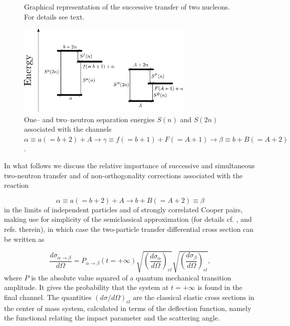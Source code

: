 \begin{subappendices}
\begin{figure}[h!]
\begin{center}
\end{center}
	\caption{Graphical representation of  the successive transfer of two nucleons. For details see text.}
\label{figC7C2}
\end{figure}
 \begin{figure}
 	\begin{center}
\includegraphics*[width=0.75\textwidth]{C7/figs_C7/figC7C3}
\end{center}
\caption{One-- and two--neutron separation energies $S(n)$ and $S(2n)$ associated with the channels $\alpha\equiv a(=b+2)+A \rightarrow \gamma \equiv f(=b+1)+F(=A+1)\rightarrow \beta \equiv b+B(=A+2)$.}\label{figC7C3}
\end{figure}
In what follows we discuss the relative importance of successive and simultaneous two-neutron transfer and of non-orthogonality 
corrections associated with the reaction 

\begin{equation}
\alpha \equiv  a(=b+2) + A \to b + B(=A+2) \equiv \beta 
\label{A1}
\end{equation}
in the limits of independent particles and of strongly correlated Cooper pairs, making use for simplicity of the semiclassical approximation (for details cf. \cite{Broglia:04a}, \cite{Broglia:75}  and refs. therein), in which case the two-particle transfer differential cross section can be written as

\begin{equation}
\frac{d \sigma_{\alpha \to \beta} }{d \Omega} = P_{\alpha \to \beta} (t = +\infty) 
\sqrt{ \left( \frac{d \sigma_{\alpha}}{d \Omega} \right)_{el} }
\sqrt{ \left( \frac{d \sigma_{\beta}}{d \Omega} \right)_{el}}, 
\label{A2}
\end{equation}
where $P$ is the absolute value squared of a quantum mechanical transition amplitude. It gives the probability that the system at $t = + \infty$ is found in the final channel. The quantities $(d \sigma/d\Omega)_{el}$ are the classical elastic cross sections  in the center of mass system, calculated in terms of the deflection function, namely the functional relating the impact parameter and the scattering angle. 


\end{subappendices}
